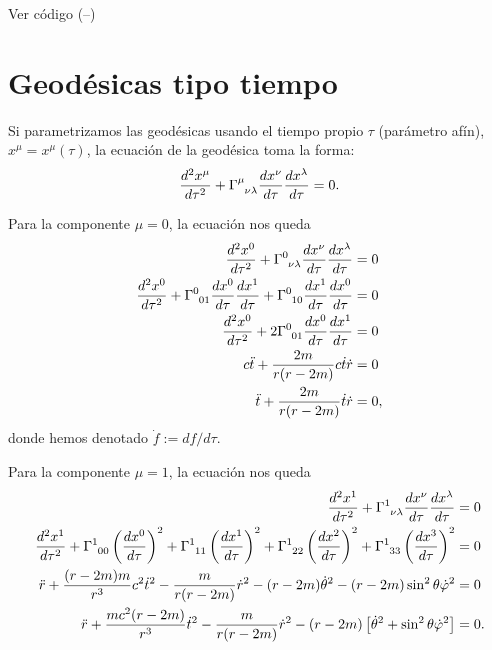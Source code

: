 \documentclass[letterpaper,11pt]{article}
\begin{document}
Ver código (--)

\section{Geodésicas tipo tiempo} 

Si parametrizamos las geodésicas usando el tiempo propio $\tau$ (parámetro afín), $x^{\mu} = x^{\mu}(\tau)$, la ecuación de la geodésica toma la forma:
\begin{equation}
    \frac{d^2 x^{\mu}}{d\tau^2} + \Gamma\indices{^\mu_{\nu \lambda}} \frac{dx^{\nu}}{d\tau} \frac{dx^{\lambda}}{d\tau} = 0.
\end{equation}

Para la componente $\mu = 0$, la ecuación nos queda
\begin{align}
\frac{d^2 x^{0}}{d\tau^2} + \Gamma\indices{^0_{\nu \lambda}} \frac{dx^{\nu}}{d\tau} \frac{dx^{\lambda}}{d\tau} &= 0 \\
\frac{d^2 x^{0}}{d\tau^2} +  \Gamma\indices{^0_{01}} \frac{dx^{0}}{d\tau} \frac{dx^1}{d\tau} +  \Gamma\indices{^0_{10}} \frac{dx^{1}}{d\tau} \frac{dx^0}{d\tau} &= 0 \\
\frac{d^2 x^{0}}{d\tau^2} +  2 \Gamma\indices{^0_{01}} \frac{dx^{0}}{d\tau} \frac{dx^1}{d\tau}  &= 0  \\
c \Ddot{t} +  \frac{2m}{r(r-2m)} c\dot{t} \dot{r}&= 0 \\
\Ddot{t} +  \frac{2m}{r(r-2m)} \dot{t} \dot{r}&= 0,
\end{align}
donde hemos denotado $\dot{f} := df/d\tau$.

Para la componente $\mu = 1$, la ecuación nos queda
\begin{align}
\frac{d^2 x^{1}}{d\tau^2} + \Gamma\indices{^1_{\nu \lambda}} \frac{dx^{\nu}}{d\tau} \frac{dx^{\lambda}}{d\tau} &= 0 \\
    \frac{d^2 x^{1}}{d\tau^2} +  \Gamma\indices{^1_{00}} \left( \frac{dx^{0}}{d\tau} \right)^2 +  \Gamma\indices{^1_{11}} \left( \frac{dx^{1}}{d\tau} \right)^2 + \Gamma\indices{^1_{22}} \left( \frac{dx^2}{d\tau}\right)^2 +  \Gamma\indices{^1_{33}} \left( \frac{dx^{3}}{d\tau} \right)^2 &= 0 \\
\Ddot{r} + \frac{(r-2m)m}{r^3} c^2 \dot{t}^2 - \frac{m}{r(r-2m)} \dot{r}^2 - (r-2m) \dot{\theta}^2 - (r-2m) \sin^2\theta \dot{\varphi}^2 &= 0 \\
\Ddot{r} + \frac{mc^2(r-2m)}{r^3} \dot{t}^2 - \frac{m}{r(r-2m)} \dot{r}^2 - (r-2m) \left[\dot{\theta}^2 + \sin^2\theta \dot{\varphi}^2 \right]  &= 0.
\end{align}
\end{document}
